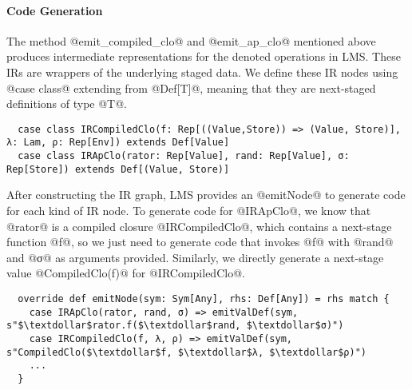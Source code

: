 \paragraph{Code Generation}

The method @emit_compiled_clo@ and @emit_ap_clo@ mentioned above produces
intermediate representations for the denoted operations in LMS. These IRs are
wrappers of the underlying staged data. We define these IR nodes using
@case class@ extending from @Def[T]@, meaning that they are next-staged definitions of
type @T@.

\begin{lstlisting}
  case class IRCompiledClo(f: Rep[((Value,Store)) => (Value, Store)], λ: Lam, ρ: Rep[Env]) extends Def[Value]
  case class IRApClo(rator: Rep[Value], rand: Rep[Value], σ: Rep[Store]) extends Def[(Value, Store)]
\end{lstlisting}

After constructing the IR graph, LMS provides an @emitNode@ to generate code for
each kind of IR node. To generate code for @IRApClo@, we know that @rator@ is a
compiled closure @IRCompiledClo@, which contains a next-stage function @f@, so
we just need to generate code that invokes @f@ with @rand@ and @σ@ as arguments
provided. Similarly, we directly generate a next-stage value @CompiledClo(f)@
for @IRCompiledClo@.

\begin{lstlisting}
  override def emitNode(sym: Sym[Any], rhs: Def[Any]) = rhs match {
    case IRApClo(rator, rand, σ) => emitValDef(sym, s"$\textdollar$rator.f($\textdollar$rand, $\textdollar$σ)")
    case IRCompiledClo(f, λ, ρ) => emitValDef(sym, s"CompiledClo($\textdollar$f, $\textdollar$λ, $\textdollar$ρ)")
    ...
  }
\end{lstlisting}
